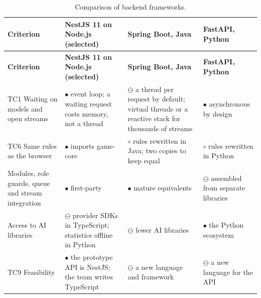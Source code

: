 {\small{}\renewcommand{\arraystretch}{1.1}
\begin{longtable}{|>{\raggedright\arraybackslash}p{}|>{\raggedright\arraybackslash}p{}|>{\raggedright\arraybackslash}p{}|>{\raggedright\arraybackslash}p{}|}
\caption{Comparison of backend frameworks.} \\
\hline
\textbf{Criterion} & \textbf{NestJS 11 on Node.js (selected)} & \textbf{Spring Boot, Java\cite{r179}} & \textbf{FastAPI, Python\cite{r181}} \\ \hline
\endfirsthead
\hline
\textbf{Criterion} & \textbf{NestJS 11 on Node.js (selected)} & \textbf{Spring Boot, Java\cite{r179}} & \textbf{FastAPI, Python\cite{r181}} \\ \hline
\endhead
TC1 Waiting on models and open streams & $\bullet$ event loop; a waiting request costs memory, not a thread & $\ominus$ a thread per request by default; virtual threads\cite{r180} or a reactive stack for thousands of streams & $\bullet$ asynchronous by design \\ \hline
TC6 Same rules as the browser & $\bullet$ imports game-core & $\circ$ rules rewritten in Java; two copies to keep equal & $\circ$ rules rewritten in Python \\ \hline
Modules, role guards, queue and stream integration & $\bullet$ first-party\cite{r149} & $\bullet$ mature equivalents & $\ominus$ assembled from separate libraries \\ \hline
Access to AI libraries & $\ominus$ provider SDKs in TypeScript; statistics offline in Python & $\ominus$ fewer AI libraries & $\bullet$ the Python ecosystem \\ \hline
TC9 Feasibility & $\bullet$ the prototype API is NestJS; the team writes TypeScript & $\ominus$ a new language and framework & $\ominus$ a new language for the API \\ \hline
\end{longtable}
}

